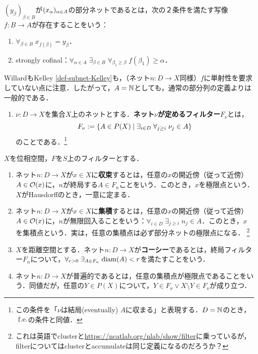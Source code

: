 \documentclass[uplatex,dvipdfmx]{jsreport}
\begin{document}
\begin{definition}[Kelley 1955]\label{def-subnet-Kelley}
    $(y_\beta)_{\beta\in B}$が$(x_\alpha)_{\alpha\in A}$の部分ネットであるとは，次の２条件を満たす写像$f:B\to A$が存在することをいう：
    \begin{enumerate}
        \item $\forall_{\beta\in B}\;x_{f(\beta)}=y_\beta$．
        \item strongly cofinal：$\forall_{\alpha\in A}\;\exists_{\beta\in B}\;\forall_{\beta_1\ge\beta}\;f(\beta_1)\ge\alpha$．
    \end{enumerate}
\end{definition}

\begin{remark}
    WillardもKelley \ref{def-subnet-Kelley}も，（ネット$n:D\to X$同様）$f$に単射性を要求していない点に注意．したがって，$A=\mathbb{N}$としても，通常の部分列の定義よりは一般的である．
\end{remark}

\begin{definition}\mbox{}
    \begin{enumerate}
        \item $\nu:D\to X$を集合$X$上のネットとする．\textbf{ネット$\nu$が定めるフィルター}$F_\nu$とは，
        \[F_\nu:=\left\{A\in P(X)\mid \exists_{i\in D}\;\forall_{j\ge i}\;\nu_j\in A\right\}\]
        のことである．\footnote{この条件を「$\nu$は結局(eventually) $A$に収まる」と表現する．$D=\mathbb{N}$のとき，$\;\mathrm{f.e.}$の条件と同値．}
    \end{enumerate}
\end{definition}

\begin{definition}
    $X$を位相空間，$F$を$S$上のフィルターとする．
    \begin{enumerate}
        \item ネット$n:D\to X$が$x\in X$に\textbf{収束}するとは，任意の$x$の開近傍（従って近傍）$A\in\mathcal{O}(x)$に，$n$が終局する$A\in F_n$ことをいう．このとき，$x$を極限点という．$X$がHausdorffのとき，一意に定まる．
        \item ネット$n:D\to X$が$x\in X$に\textbf{集積}するとは，任意の$x$の開近傍（従って近傍）$A\in\mathcal{O}(x)$に，$n$が無限回入ることをいう：$\forall_{i\in D}\;\exists_{j\ge i}\;n_j\in A$．このとき，$x$を集積点という．実は，任意の集積点は必ず部分ネットの極限点になる．
        \footnote{これは英語でclusterと\url{https://ncatlab.org/nlab/show/filter}に乗っているが，filterについてはclusterとaccumulateは同じ定義になるのだろうか？}
        \item $X$を距離空間とする．ネット$n:D\to X$が\textbf{コーシー}であるとは，終局フィルター$F_n$について，$\forall_{r>0}\;\exists_{A\in F_n}\;\mathrm{diam}(A)<r$を満たすことをいう．
        \item ネット$n:D\to X$が普遍的であるとは，任意の集積点が極限点であることをいう．同値だが，任意の$Y\in P(X)$について，$Y\in F_\nu\lor X\setminus Y\in F_\nu$が成り立つ．
    \end{enumerate}
\end{definition}
\end{document}
